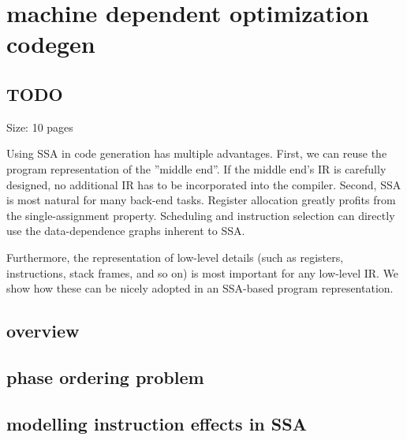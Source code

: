 \chapter{machine dependent optimization codegen }
\section{TODO}


Size: 10 pages

Using SSA in code generation has multiple advantages.
First, we can reuse the program representation of the ''middle end''.
If the middle end's IR is carefully designed, no additional IR has to be incorporated into the compiler.
Second, SSA is most natural for many back-end tasks.
Register allocation greatly profits from the single-assignment property.
Scheduling and instruction selection can directly use the data-dependence graphs inherent to SSA.

Furthermore, the representation of low-level details (such as registers, instructions, stack frames, and so on) is most important for any low-level IR.
We show how these can be nicely adopted in an SSA-based program representation.

\section{overview}
\section{phase ordering problem}
\section{modelling instruction effects in SSA}
